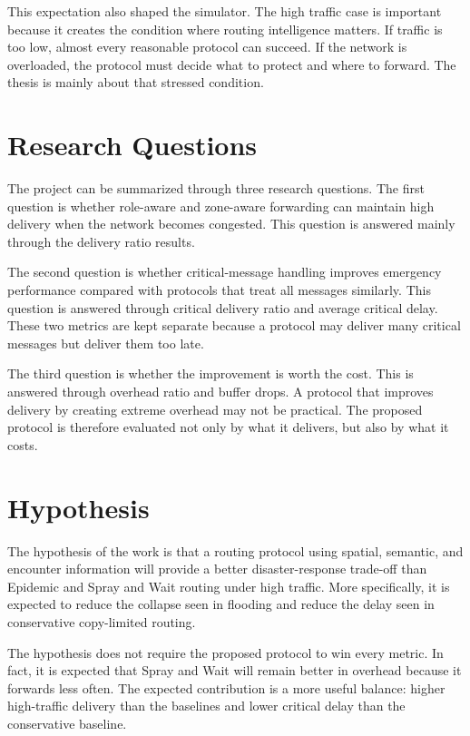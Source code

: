 This expectation also shaped the simulator. The high traffic case is important because it creates the condition where routing intelligence matters. If traffic is too low, almost every reasonable protocol can succeed. If the network is overloaded, the protocol must decide what to protect and where to forward. The thesis is mainly about that stressed condition.

\section{Research Questions}
The project can be summarized through three research questions. The first question is whether role-aware and zone-aware forwarding can maintain high delivery when the network becomes congested. This question is answered mainly through the delivery ratio results.

The second question is whether critical-message handling improves emergency performance compared with protocols that treat all messages similarly. This question is answered through critical delivery ratio and average critical delay. These two metrics are kept separate because a protocol may deliver many critical messages but deliver them too late.

The third question is whether the improvement is worth the cost. This is answered through overhead ratio and buffer drops. A protocol that improves delivery by creating extreme overhead may not be practical. The proposed protocol is therefore evaluated not only by what it delivers, but also by what it costs.

\section{Hypothesis}
The hypothesis of the work is that a routing protocol using spatial, semantic, and encounter information will provide a better disaster-response trade-off than Epidemic and Spray and Wait routing under high traffic. More specifically, it is expected to reduce the collapse seen in flooding and reduce the delay seen in conservative copy-limited routing.

The hypothesis does not require the proposed protocol to win every metric. In fact, it is expected that Spray and Wait will remain better in overhead because it forwards less often. The expected contribution is a more useful balance: higher high-traffic delivery than the baselines and lower critical delay than the conservative baseline.
